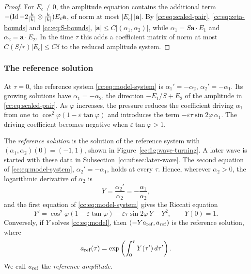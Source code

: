 \begin{proof}
For $E_c\ne0$, the amplitude equation contains the additional term
$-(\operatorname{Id}-2\frac{k}{|k|}\otimes\frac{k}{|k|})E_c\mathbf a$, of norm at
most $|E_c|\,|\mathbf a|$. By \eqref{cc:eq:scaled-pair},
\eqref{cc:eq:zeta-bounds} and \eqref{cc:eq:S-bounds},
$|\mathbf a|\le C|(\alpha_1,\alpha_2)|$, while
$\alpha_1=S\mathbf a\cdot E_1$ and $\alpha_2=\mathbf a\cdot E_2$.
In the time $\tau$ this adds a coefficient matrix of norm at most
$C(S/r)|E_c|\le C\delta$ to the reduced amplitude system.
\end{proof}

\subsubsection{The reference solution}\label{cc:sec:scalar}
At $\tau=0$, the reference system \eqref{cc:eq:model-system} is
$\alpha_1'=-\alpha_2$, $\alpha_2'=-\alpha_1$. Its growing solutions
have $\alpha_1=-\alpha_2$, the direction $-E_1/S+E_2$ of the amplitude
in \eqref{cc:eq:scaled-pair}. As $\varphi$ increases, the pressure
reduces the coefficient driving $\alpha_1$ from one to
$\cos^2\varphi(1-\varepsilon\tan\varphi)$ and introduces the term
$-\varepsilon\tau\sin2\varphi\,\alpha_1$. The driving coefficient
becomes negative when $\varepsilon\tan\varphi>1$.

The \emph{reference solution} is the solution of the reference system
with $(\alpha_1,\alpha_2)(0)=(-1,1)$, shown in
Figure~\ref{cc:fig:wave-turning}. A later wave is started with these
data in Subsection~\ref{cc:uf:sec:later-wave}. The second equation of
\eqref{cc:eq:model-system}, $\alpha_2'=-\alpha_1$, holds at every
$\tau$. Hence, wherever $\alpha_2>0$, the logarithmic derivative of
$\alpha_2$ is
\[
 Y=\frac{\alpha_2'}{\alpha_2}=-\frac{\alpha_1}{\alpha_2},
\]
and the first equation of \eqref{cc:eq:model-system} gives the Riccati
equation
\begin{equation}\label{cc:eq:model}
 Y'=\cos^2\varphi(1-\varepsilon\tan\varphi)
           -\varepsilon\tau\sin2\varphi\,Y-Y^2,\qquad Y(0)=1.
\end{equation}
Conversely, if $Y$ solves \eqref{cc:eq:model}, then
$(-Ya_{\rm ref},a_{\rm ref})$ is the reference solution, where
\[
 a_{\rm ref}(\tau)=\exp\left(\int_0^\tau Y(\tau')\,d\tau'\right).
\]
We call $a_{\rm ref}$ the \emph{reference amplitude}.

